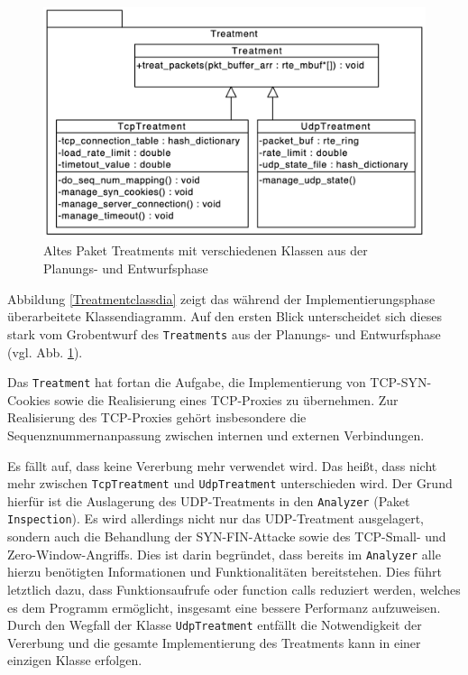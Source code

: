 \documentclass[../review_2.tex]{subfiles}
\begin{document}
\begin{figure}[h]
    \centering
    \includegraphics[width=0.7\linewidth]{img/package_Treatment.png}
    \caption{Altes Paket Treatments mit verschiedenen Klassen aus der Planungs- und Entwurfsphase}
    \label{Treatmentclassdia2}
\end{figure}

Abbildung \ref{Treatmentclassdia} zeigt das während der Implementierungsphase überarbeitete Klassendiagramm. Auf den ersten Blick unterscheidet sich dieses stark vom Grobentwurf des \texttt{Treatments} aus der Planungs- und Entwurfsphase (vgl. Abb. \ref{Treatmentclassdia2}).

Das \texttt{Treatment} hat fortan die Aufgabe, die Implementierung von TCP-SYN-Cookies sowie die Realisierung eines TCP-Proxies zu übernehmen. Zur Realisierung des TCP-Proxies gehört insbesondere die Sequenznummernanpassung zwischen internen und externen Verbindungen.

Es fällt auf, dass keine Vererbung mehr verwendet wird. Das heißt, dass nicht mehr zwischen \texttt{TcpTreatment} und \texttt{UdpTreatment} unterschieden wird. Der Grund hierfür ist die Auslagerung des UDP-Treatments in den \texttt{Analyzer} (Paket \texttt{Inspection}). Es wird allerdings nicht nur das UDP-Treatment ausgelagert, sondern auch die Behandlung der SYN-FIN-Attacke sowie des TCP-Small- und Zero-Window-Angriffs. Dies ist darin begründet, dass bereits im \texttt{Analyzer} alle hierzu benötigten Informationen und Funktionalitäten bereitstehen. Dies führt letztlich dazu, dass Funktionsaufrufe oder function calls reduziert werden, welches es dem Programm ermöglicht, insgesamt eine bessere Performanz aufzuweisen.
Durch den Wegfall der Klasse \texttt{UdpTreatment} entfällt die Notwendigkeit der Vererbung und die gesamte Implementierung des Treatments kann in einer einzigen Klasse erfolgen.
\end{document}

